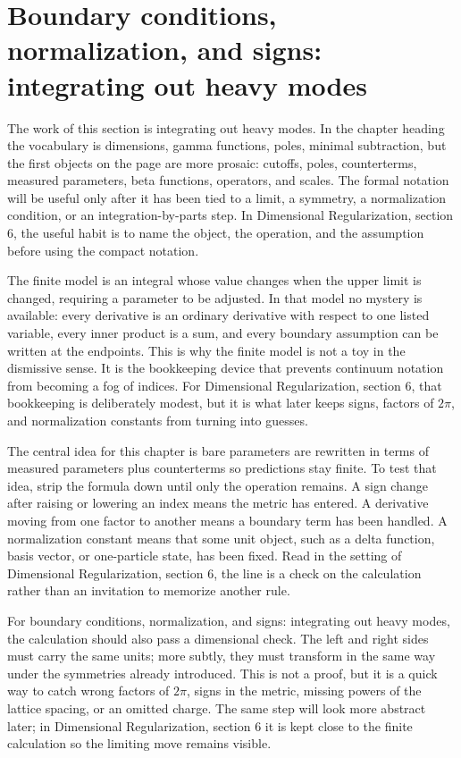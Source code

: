 \section{Boundary conditions, normalization, and signs: integrating out heavy modes}

The work of this section is integrating out heavy modes.  In the chapter heading the vocabulary is dimensions, gamma functions, poles, minimal subtraction, but the first objects on the page are more prosaic: cutoffs, poles, counterterms, measured parameters, beta functions, operators, and scales.  The formal notation will be useful only after it has been tied to a limit, a symmetry, a normalization condition, or an integration-by-parts step.  In Dimensional Regularization, section 6, the useful habit is to name the object, the operation, and the assumption before using the compact notation.

The finite model is an integral whose value changes when the upper limit is changed, requiring a parameter to be adjusted.  In that model no mystery is available: every derivative is an ordinary derivative with respect to one listed variable, every inner product is a sum, and every boundary assumption can be written at the endpoints.  This is why the finite model is not a toy in the dismissive sense.  It is the bookkeeping device that prevents continuum notation from becoming a fog of indices.  For Dimensional Regularization, section 6, that bookkeeping is deliberately modest, but it is what later keeps signs, factors of \(2\pi\), and normalization constants from turning into guesses.

The central idea for this chapter is bare parameters are rewritten in terms of measured parameters plus counterterms so predictions stay finite.  To test that idea, strip the formula down until only the operation remains.  A sign change after raising or lowering an index means the metric has entered.  A derivative moving from one factor to another means a boundary term has been handled.  A normalization constant means that some unit object, such as a delta function, basis vector, or one-particle state, has been fixed.  Read in the setting of Dimensional Regularization, section 6, the line is a check on the calculation rather than an invitation to memorize another rule.

For boundary conditions, normalization, and signs: integrating out heavy modes, the calculation should also pass a dimensional check.  The left and right sides must carry the same units; more subtly, they must transform in the same way under the symmetries already introduced.  This is not a proof, but it is a quick way to catch wrong factors of \(2\pi\), signs in the metric, missing powers of the lattice spacing, or an omitted charge.  The same step will look more abstract later; in Dimensional Regularization, section 6 it is kept close to the finite calculation so the limiting move remains visible.

